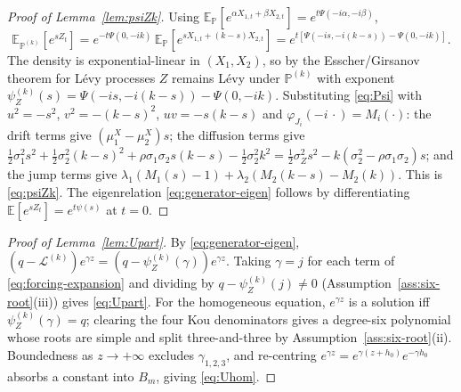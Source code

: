 \documentclass[11pt]{article}
\newcommand{\E}{\mathbb{E}}
\renewcommand{\P}{\mathbb{P}}
\theoremstyle{plain}
\theoremstyle{definition}
\theoremstyle{remark}
\begin{document}
\begin{proof}[Proof of Lemma~\ref{lem:psiZk}]\label{proof:lem:psiZk}
Using $\E_\P[e^{\alpha X_{1,t}+\beta X_{2,t}}]=e^{t\Psi(-i\alpha,-i\beta)}$,
\[
\E_{\P^{(k)}}\!\left[e^{sZ_t}\right]
=
e^{-t\Psi(0,-ik)}\,
\E_\P\!\left[e^{s X_{1,t}+(k-s)X_{2,t}}\right]
=
e^{t\left[\Psi(-is,-i(k-s))-\Psi(0,-ik)\right]}.
\]
The density is exponential-linear in $(X_1,X_2)$, so by the Esscher/Girsanov theorem for L\'evy
processes $Z$ remains L\'evy under $\P^{(k)}$ with exponent
$\psi_Z^{(k)}(s)=\Psi(-is,-i(k-s))-\Psi(0,-ik)$. Substituting \eqref{eq:Psi} with $u^2=-s^2$,
$v^2=-(k-s)^2$, $uv=-s(k-s)$ and $\varphi_{J_i}(-i\,\cdot)=M_i(\cdot)$: the drift terms give
$(\mu_1^X-\mu_2^X)s$; the diffusion terms give
$\tfrac12\sigma_1^2 s^2+\tfrac12\sigma_2^2(k-s)^2+\rho\sigma_1\sigma_2 s(k-s)-\tfrac12\sigma_2^2k^2
=\tfrac12\sigma_Z^2s^2-k(\sigma_2^2-\rho\sigma_1\sigma_2)s$; and the jump terms give
$\lambda_1(M_1(s)-1)+\lambda_2(M_2(k-s)-M_2(k))$. This is \eqref{eq:psiZk}. The eigenrelation
\eqref{eq:generator-eigen} follows by differentiating $\E[e^{sZ_t}]=e^{t\psi(s)}$ at $t=0$.
\end{proof}

\begin{proof}[Proof of Lemma~\ref{lem:Upart}]\label{proof:lem:Upart}
By \eqref{eq:generator-eigen}, $(q-\mathcal L^{(k)})e^{\gamma z}=(q-\psi_Z^{(k)}(\gamma))e^{\gamma z}$.
Taking $\gamma=j$ for each term of \eqref{eq:forcing-expansion} and dividing by
$q-\psi_Z^{(k)}(j)\neq0$ (Assumption~\ref{ass:six-root}(iii)) gives \eqref{eq:Upart}. For the
homogeneous equation, $e^{\gamma z}$ is a solution iff $\psi_Z^{(k)}(\gamma)=q$; clearing the four
Kou denominators gives a degree-six polynomial whose roots are simple and split three-and-three by
Assumption~\ref{ass:six-root}(ii). Boundedness as $z\to+\infty$ excludes $\gamma_{1,2,3}$, and
re-centring $e^{\gamma z}=e^{\gamma(z+h_0)}e^{-\gamma h_0}$ absorbs a constant into $B_m$, giving
\eqref{eq:Uhom}.
\end{proof}
\end{document}
